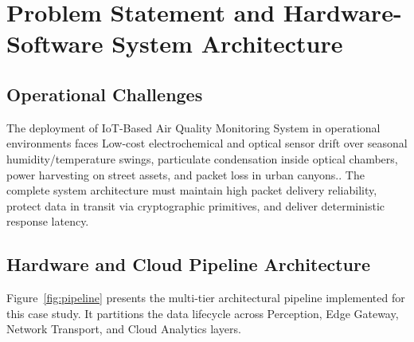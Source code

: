 \section{Problem Statement and Hardware-Software System Architecture}

\subsection{Operational Challenges}
The deployment of IoT-Based Air Quality Monitoring System in operational environments faces Low-cost electrochemical and optical sensor drift over seasonal humidity/temperature swings, particulate condensation inside optical chambers, power harvesting on street assets, and packet loss in urban canyons.. The complete system architecture must maintain high packet delivery reliability, protect data in transit via cryptographic primitives, and deliver deterministic response latency.

\subsection{Hardware and Cloud Pipeline Architecture}
Figure~\ref{fig:pipeline} presents the multi-tier architectural pipeline implemented for this case study. It partitions the data lifecycle across Perception, Edge Gateway, Network Transport, and Cloud Analytics layers.

